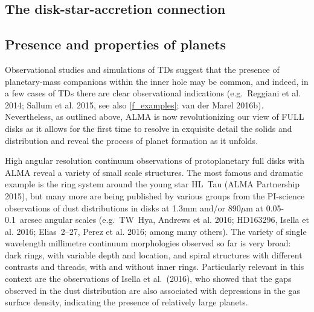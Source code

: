 \documentclass[10pt,fleqn,twoside]{article}
\begin{document}
\subsection{The disk-star-accretion connection}


\subsection{Presence and properties of planets}

Observational studies and simulations of TDs suggest that the presence of planetary-mass companions within the inner hole may be common, and indeed, in a few cases of TDs there are clear observational indications (e.g.\ Reggiani et al. 2014; Sallum et al. 2015, see also \ref{f_examples}; van der Marel 2016b).
Nevertheless, 
as outlined above, ALMA is now revolutionizing our view of FULL disks as it allows for the first time to resolve in exquisite detail the solids and distribution and reveal the process of planet formation as it unfolds.

High angular resolution continuum observations of protoplanetary full disks with ALMA reveal a variety of small scale structures. The most famous and dramatic example is the ring system around the young star HL~Tau (ALMA Partnership 2015), but many more are being published by various groups from the PI-science observations of dust distributions in disks at 1.3mm and/or 890$\mu$m at 0.05-0.1~arcsec angular scales (e.g.\ TW~Hya, Andrews et al. 2016; HD163296, Isella et al. 2016; Elias~2--27, Perez et al. 2016; among many others). The variety of single wavelength millimetre continuum morphologies observed so far is very broad: dark rings, with variable depth and location, and spiral structures with different contrasts and threads, with and without inner rings. Particularly relevant in this context are the observations of Isella et al.~(2016), who showed that the gaps observed in the dust distribution are also associated with depressions in the gas surface density, indicating the presence of relatively large planets.
\end{document}
